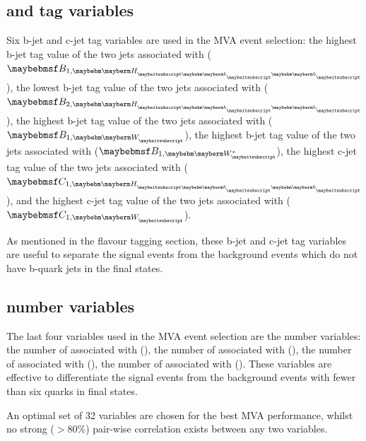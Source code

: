 \subsection{\Pbottom and \Pcharm tag  variables}

Six b-jet and c-jet tag variables are used in the MVA event selection: the highest b-jet tag value of the two jets associated with \Hbb ($\btagFull{1,\Hbb}$), the lowest b-jet tag value of the two jets associated with \Hbb ($\btagFull{2,\Hbb}$), the highest b-jet tag value of the two jets associated with \PW ($\btagFull{1,\PW}$), the highest b-jet tag value of the two jets associated with \W* ($\btagFull{1,\W*}$), the highest c-jet tag value of the two jets associated with \Hbb ($\ctagFull{1,\Hbb}$), and the highest c-jet tag value of the two jets associated with \PW ($\ctagFull{1,\PW}$).

As mentioned in the flavour tagging section, these b-jet and c-jet tag variables are useful to separate the signal events from the background events which do not have b-quark jets in the final states.

\subsection{\PFOs number  variables}

The last four variables used in the MVA event selection are the \PFOs number  variables: the number of \PFOs associated with \Hbb (\Hbb), the number of \PFOs associated with \HWW (\HWW), the number of \PFOs associated with \PW (\PW), the number of \PFOs associated with \W* (\W*). These variables are effective to differentiate the signal events from the background events with fewer than six quarks in final states.

An optimal set of 32 variables are chosen for the best MVA performance, whilst no strong ($>80\%$) pair-wise correlation exists between any two variables. %

